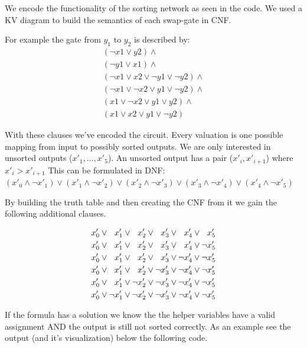 \documentclass{base}
\begin{document}
We encode the functionality of the sorting network as seen in the code.
We used a KV diagram to build the semantics of each swap-gate in CNF.

For example the gate from $y_1$ to $y_2$ is described by:
\begin{align}
(\neg x1 \lor  y2) \land   \\
(\neg y1 \lor  x1) \land  \\
(\neg x1 \lor  x2 \lor  \neg y1 \lor  \neg y2) \land  \\
(\neg x1 \lor  \neg x2 \lor  y1 \lor  \neg y2) \land  \\
(x1 \lor  \neg x2 \lor  y1 \lor  y2) \land  \\
(x1 \lor  x2 \lor  y1 \lor  \neg y2)
\end{align}



With these clauses we've encoded the circuit. Every valuation is one possible mapping from input to possibly sorted outputs.
We are only interested in unsorted outputs ($x'_1,\dots,x'_5$). An unsorted output has a pair ($x'_i, x'_{i+1}$) where $x'_i > x'_{i+1}$
This can be formulated in DNF: \\
$(x'_0 \land \neg x'_1) \lor (x'_1 \land \neg x'_2) \lor (x'_2 \land \neg x'_3) \lor (x'_3 \land \neg x'_4) \lor (x'_4 \land \neg x'_5)$


By building the truth table and then creating the CNF from it we gain the following additional clauses.

\newcommand{\veg}{\hphantom{\neg}}
\begin{align*}
    x'_0 \lor \veg x'_1 \lor \veg x'_2 \lor \veg x'_3 \lor \veg x'_4 \lor \veg x'_5 \\
    x'_0 \lor \veg x'_1 \lor \veg x'_2 \lor \veg x'_3 \lor \veg x'_4 \lor \neg x'_5 \\
    x'_0 \lor \veg x'_1 \lor \veg x'_2 \lor \veg x'_3 \lor \neg x'_4 \lor \neg x'_5 \\
    x'_0 \lor \veg x'_1 \lor \veg x'_2 \lor \neg x'_3 \lor \neg x'_4 \lor \neg x'_5 \\
    x'_0 \lor \veg x'_1 \lor \neg x'_2 \lor \neg x'_3 \lor \neg x'_4 \lor \neg x'_5 \\
    x'_0 \lor \neg x'_1 \lor \neg x'_2 \lor \neg x'_3 \lor \neg x'_4 \lor \neg x'_5 \\
\end{align*}



If the formula has a solution we know the the helper variables have a valid assignment AND the output is still not sorted correctly.
As an example see the output (and it's visualization) below the following code.
\end{document}
